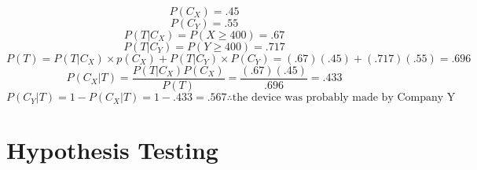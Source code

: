 \documentclass[8pt]{extarticle}
\begin{document}
{\begin{minipage}{\linewidth}
\begin{equation}
            P(C_X) = .45
        \end{equation}
        \begin{equation}
            P(C_Y) = .55
        \end{equation}
        \begin{equation}
            P(T|C_X) = P(X \geq 400) = .67
        \end{equation}
        \begin{equation}
            P(T|C_Y) = P(Y \geq 400) = .717
        \end{equation}
        \begin{equation}
            P(T) = P(T|C_X) \times p(C_X) + P(T|C_Y) \times P(C_Y) = (.67)(.45) + (.717)(.55) = .696
        \end{equation}
        \begin{equation}
            P(C_X|T) = \frac{P(T|C_X)P(C_X)}{P(T)} = \frac{(.67)(.45)}{.696} = .433
        \end{equation}
        \begin{equation}
            P(C_Y|T) = 1 - P(C_X|T) = 1 - .433 = .567 \therefore \text{the device was probably made by Company Y}
        \end{equation}
    \end{minipage}
}

\section{Hypothesis Testing}
\end{document}
